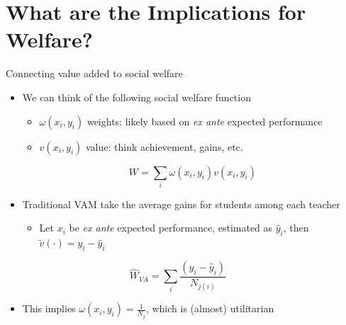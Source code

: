 \documentclass[t,aspectratio=169,11pt]{beamer}
\begin{document}

\section{What are the Implications for Welfare?}



\begin{frame}{Connecting value added to social welfare}

\begin{itemize}
    \item We can think of the following social welfare function
    \begin{itemize}
        \item $\omega(x_i,y_i)$ weights: likely based on \textit{ex ante} expected performance
        \item $v(x_i,y_i)$ value: think achievement, gains, etc.
    \end{itemize}
    \[
    W  = \sum_i \omega(x_i,y_i) v(x_i,y_i) 
    \] 
    
    \item Traditional VAM take the average gains for students among each teacher
    \begin{itemize}
        \item Let $x_i$ be \textit{ex ante} expected performance, estimated as $\hat{y}_i$, then $\tilde{v}(\cdot) = y_i - \hat{y}_i$
    \end{itemize}
    \[
    \hat{W}_{VA}  = \sum_i \frac{(y_i-\hat{y}_i)}{N_{j(i)}} \hspace{3em}
    \]
    
    \item This implies $\omega(x_i,y_i)=\frac{1}{N_j}$, which is (almost) utilitarian

\end{itemize}


\end{frame}
\end{document}
